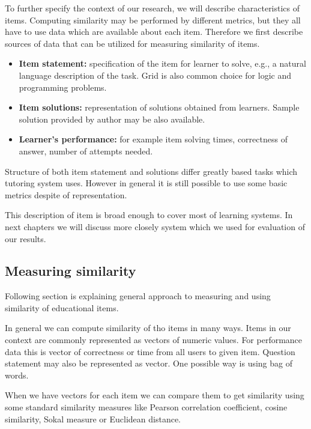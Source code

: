 \documentclass[
  digital, %
  table,   %
  nolof,     %
  nolot,     %
  nocover
]{fithesis3}
\begin{document}

To further specify the context of our research, we will describe
characteristics of items. Computing similarity may be performed by different metrics, but they all have to use data which are available about each item. Therefore we first describe
sources of data that can be utilized for measuring similarity of items.

\begin{itemize}
\item
  \textbf{Item statement:} specification of the item for learner
  to solve, e.g., a natural language description of the task. Grid is also common choice for logic and programming problems.
\item
  \textbf{Item solutions:} representation of solutions obtained from
  learners. Sample solution provided by author may be also available.
\item
  \textbf{Learner's performance:} for example item solving times,
  correctness of answer, number of attempts needed.
\end{itemize}

Structure of both item statement and solutions differ greatly based tasks which tutoring system uses. However in general it is still possible to use some basic metrics despite of representation.

This description of item is broad enough to cover most of learning
systems. In next chapters we will discuss more closely system which we used for evaluation of our results.

\subsection{Measuring similarity}\label{measuring-similarity}

Following section is explaining general approach to measuring and using similarity of educational
items.


In general we can compute similarity of tho items in many ways. Items in our context are commonly represented as vectors of numeric values. For performance data this is vector of correctness or time from all users to given item. Question statement may also be represented as vector. One possible way is using bag of words.

When we have vectors for each item we can compare them to get similarity using some standard similarity measures like Pearson correlation coefficient, cosine similarity, Sokal measure or Euclidean distance.
\end{document}
